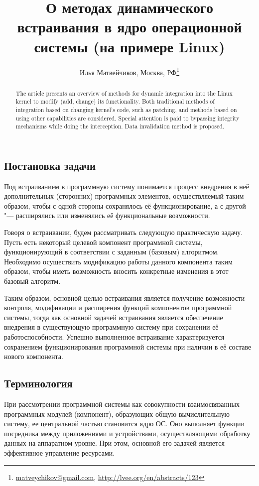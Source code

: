 \documentclass[10pt, a5paper]{article}
\begin{document}
\title{О методах динамического встраивания в ядро операционной системы (на примере Linux)}
\author{Илья Матвейчиков, Москва, РФ\footnote{\url{matveychikov@gmail.com}, \url{http://lvee.org/en/abstracts/123}}}
\maketitle
\begin{abstract}
The article presents an overview of methods for dynamic integration into the Linux kernel to modify (add, change) its functionality. Both traditional methods of integration based on changing kernel's code, such as patching, and methods based on using other capabilities are considered. Special attention is paid to bypassing integrity mechanisms while doing the interception. Data invalidation method is proposed.
\end{abstract}
\subsection*{Постановка задачи}

Под встраиванием в программную систему понимается процесс внедрения в неё дополнительных (сторонних) программных элементов, осуществляемый таким образом, чтобы с одной стороны сохранялось её функционирование, а с другой "--- расширялись или изменялись её функциональные возможности.

Говоря о встраивании, будем рассматривать следующую практическую задачу. Пусть есть некоторый целевой компонент программной системы, функционирующий в соответствии с заданным (базовым) алгоритмом. Необходимо осуществить модификацию работы данного компонента таким образом, чтобы иметь возможность вносить конкретные изменения в этот базовый алгоритм.

Таким образом, основной целью встраивания является получение возможности контроля, модификации и расширения функций компонентов программной системы, тогда как основной задачей встраивания является обеспечение внедрения в существующую программную систему при сохранении её работоспособности. Успешно выполненное встраивание характеризуется сохранением функционирования программной системы при наличии в её составе нового компонента.

\subsection*{Терминология}

При рассмотрении программной системы как совокупности взаимосвязанных программных модулей (компонент), образующих общую вычислительную систему, ее центральной частью становится ядро ОС. Оно выполняет функции посредника между приложениями и устройствами, осуществляющими обработку данных на аппаратном уровне. При этом, основной его задачей является эффективное управление ресурсами.
\end{document}
